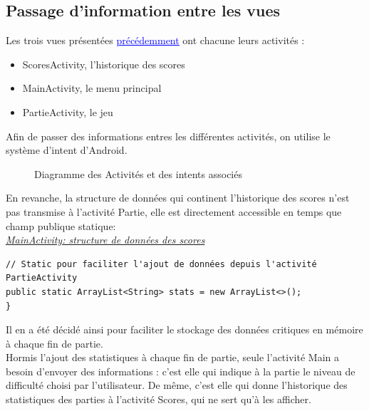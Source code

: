 \documentclass{article}
\begin{document}
\subsection{Passage d'information entre les vues}
Les trois vues présentées \hyperref[fig:figure1]{\textcolor{blue}{\underline{précédemment}}} ont chacune leurs activités : 
\begin{itemize}
    \item  ScoresActivity, l'historique des scores
    \item  MainActivity, le menu principal
    \item  PartieActivity, le jeu \\
\end{itemize}

Afin de passer des informations entres les différentes activités, on utilise le système d'intent d'Android. 

\begin{figure}[H]
    \centering
        \caption{Diagramme des Activités et des intents associés}
\end{figure}

En revanche, la structure de données qui continent l'historique des scores n'est pas transmise à l'activité Partie, elle est directement accessible en temps que champ publique statique:\\

\noindent \underline{\textit{MainActivity: structure de données des scores}}
\label{code:listdata}
\begin{verbatim}
// Static pour faciliter l'ajout de données depuis l'activité PartieActivity
public static ArrayList<String> stats = new ArrayList<>();
}
\end{verbatim}
Il en a été décidé ainsi pour faciliter le stockage des données critiques en mémoire à chaque fin de partie.\\

Hormis l'ajout des statistiques à chaque fin de partie, seule l'activité Main a besoin d'envoyer des informations : c'est elle qui indique à la partie le niveau de difficulté choisi par l'utilisateur. De même, c'est elle qui donne l'historique des statistiques des parties à l'activité Scores, qui ne sert qu'à les afficher.\\
\end{document}
